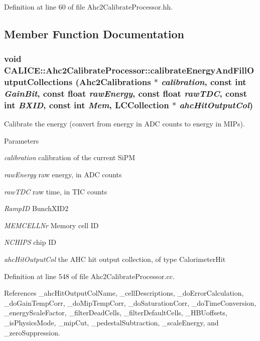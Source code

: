 Definition at line 60 of file Ahc2CalibrateProcessor.hh.

\subsection{Member Function Documentation}
\subsubsection[{calibrateEnergyAndFillOutputCollections}]{\setlength{\rightskip}{0pt plus 5cm}void CALICE::Ahc2CalibrateProcessor::calibrateEnergyAndFillOutputCollections (Ahc2Calibrations $\ast$ {\em calibration}, \/  const int {\em GainBit}, \/  const float {\em rawEnergy}, \/  const float {\em rawTDC}, \/  const int {\em BXID}, \/  const int {\em Mem}, \/  LCCollection $\ast$ {\em ahcHitOutputCol})\hspace{0.3cm}{\ttfamily  [protected]}}\label{classCALICE_1_1Ahc2CalibrateProcessor_ac9a642a6aea42b6ad22e153e8c5f0fca}


Calibrate the energy (convert from energy in ADC counts to energy in MIPs). 
\begin{DoxyParams}{Parameters}
\item[{\em calibration}]calibration of the current SiPM \item[{\em rawEnergy}]raw energy, in ADC counts \item[{\em rawTDC}]raw time, in TIC counts \item[{\em RampID}]BunchXID2 \item[{\em MEMCELLNr}]Memory cell ID \item[{\em NCHIPS}]chip ID \item[{\em ahcHitOutputCol}]the AHC hit output collection, of type CalorimeterHit \end{DoxyParams}


Definition at line 548 of file Ahc2CalibrateProcessor.cc.

References \_\-ahcHitOutputColName, \_\-cellDescriptions, \_\-doErrorCalculation, \_\-doGainTempCorr, \_\-doMipTempCorr, \_\-doSaturationCorr, \_\-doTimeConversion, \_\-energyScaleFactor, \_\-filterDeadCells, \_\-filterDefaultCells, \_\-HBUoffsets, \_\-isPhysicsMode, \_\-mipCut, \_\-pedestalSubtraction, \_\-scaleEnergy, and \_\-zeroSuppression.

